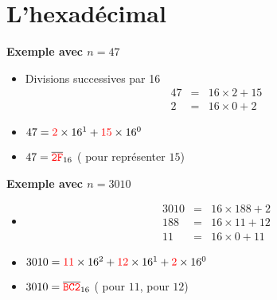 \section{L'hexadécimal}


\begin{frame}



\pause
\textbf{Exemple avec $n=47$}

  \begin{itemize}
    \pause
  \item Divisions successives par 16
    $$\begin{array}{rcl}
  47 &=& 16\times 2 + 15\\
  2  &=& 16\times 0 + 2
  \end{array}$$
  \vspace*{-3ex}
  
  \pause
  \item $47 = \textcolor{red}{2}\times 16^1 + \textcolor{red}{15}\times 16^0$
  \pause
  \item $47 = \overline{\textcolor{red}{\mathtt{2F}}}_{16}$
  \quad ( pour représenter $15$)
  \end{itemize}
  
\medskip

\pause
\textbf{Exemple avec $n=3010$}
  \begin{itemize}

  \item  $$\begin{array}{rcl}
  3010 &=& 16\times 188 + 2\\
  188  &=& 16\times 11 + 12\\
  11   &=& 16\times 0 + 11
  \end{array}$$  \vspace*{-1ex}
  
  \pause
  \item $3010 = \textcolor{red}{11}\times 16^2 + \textcolor{red}{12}\times 16^1 + \textcolor{red}{2}\times 16^0$
    \pause
  \item $3010 = \overline{\textcolor{red}{\mathtt{BC2}}}_{16}$  
 \quad ( pour $11$,  pour $12$)  
  \end{itemize}

\end{frame}

